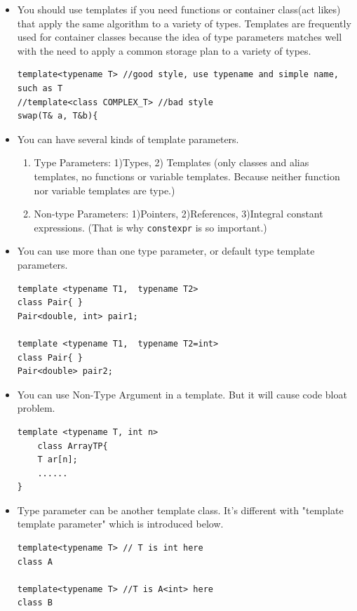 \documentclass[a4paper,11pt,twoside]{book}
\begin{document}
\begin{itemize}
	\item You should use templates if you need functions or container class(act likes) that apply the same algorithm to a variety of types. Templates are frequently used for container classes because the idea of type parameters matches well with the need to apply a common storage plan to a variety of types. 
\begin{lstlisting}[numbers=none]
template<typename T> //good style, use typename and simple name, such as T
//template<class COMPLEX_T> //bad style
swap(T& a, T&b){	
\end{lstlisting}
	\item You can have several kinds of template parameters.
	\begin{enumerate}
		\item  Type Parameters: 1)Types, 2) Templates (only classes and alias templates, no functions or variable templates. Because neither function nor variable templates are type.)
		
		
		\item Non-type Parameters: 1)Pointers, 2)References, 3)Integral constant expressions. (That is why \texttt{constexpr} is so important.)
		
	\end{enumerate}

        \item You can use more than one type parameter, or default type template parameters.
\begin{lstlisting}[numbers=none]
template <typename T1,  typename T2>
class Pair{ }
Pair<double, int> pair1;

template <typename T1,  typename T2=int>
class Pair{ }
Pair<double> pair2;
\end{lstlisting}

    \item You can use Non-Type Argument in a template. But it will cause code bloat problem. 
\begin{lstlisting}[numbers=none]
template <typename T, int n>
	class ArrayTP{
	T ar[n];
	......
}
\end{lstlisting}

    \item Type parameter can be another template class.  It's different with "template template parameter" which is introduced below.
\begin{lstlisting}[]
template<typename T> // T is int here
class A

template<typename T> //T is A<int> here
class B


\end{lstlisting}
\end{itemize}
\end{document}
